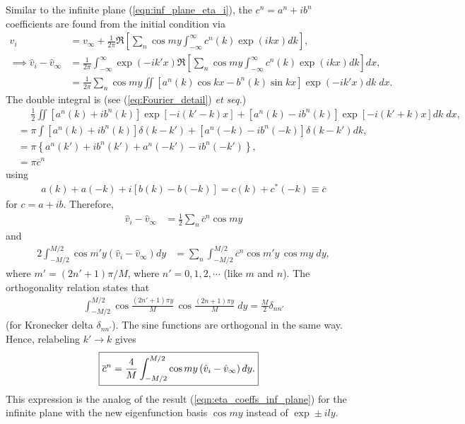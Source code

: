 \documentclass[10pt,reqno]{amsart}
\begin{document}
Similar to the infinite plane (\ref{eqn:inf_plane_eta_i}), the $c^n = a^n + i b^n$ coefficients are found from the initial condition via
\begin{align}
v_i & = v_\infty + \frac{1}{2 \pi} \Re \left[ \sum_n  \cos m y \int_{-\infty}^{\infty} c^n (k) \exp \left(i k x \right)  dk \right] ,  \label{eq:channel_c_v} \\
\implies \hat{v}_i - \hat{v}_\infty & = \frac{1}{2 \pi} \int_{-\infty}^{\infty} \exp \left( - i k' x \right) \Re \left[ \sum_n  \cos m y \int_{-\infty}^{\infty} c^n (k) \exp \left(i k x \right) dk  \right] dx ,   \\
& = \frac{1}{2 \pi} \sum_n \cos m y \iint \left[ a^n (k) \cos k x - b^n (k) \sin k x \right] \exp \left(-i k' x \right) dk \;  dx .   
\end{align}
The double integral is (see (\ref{eq:Fourier_detail}) \textit{et seq.})
\begin{align}
&\phantom{ =} \frac{1}{2} \iint \left[ a^n (k) + i b^n (k) \right] \exp \left[-i \left( k' - k \right) x \right] + \left[ a^n (k) - i b^n (k) \right] \exp \left[-i \left(k' + k \right) x \right] dk \;  dx ,   \\
& = \pi \int \left[ a^n (k) + i b^n (k) \right] \delta \left( k - k' \right)  + \left[ a^n (-k) - i b^n (-k) \right] \delta \left(k - k' \right)  dk  ,   \\
& = \pi \left\{ a^n (k') + i b^n (k') + a^n (-k') - i b^n (-k') \right\}  , \\
& = \pi \overline{c}^n
\end{align}
using
\begin{align}
a(k) + a(-k) + i \left[ b(k) - b(-k) \right] = c(k) + c^* (-k) \equiv \overline{c}
\label{eqn:overline_operator}
\end{align}
 for $c = a + i b$.
Therefore, 
\begin{align}
\hat{v}_i - \hat{v}_\infty & = \frac{1}{2} \sum_n \overline{c}^n \cos m y 
\label{eqn:channel_c_n_formula}
\end{align}
and
\begin{align}
2 \int_{-M/2}^{M/2}  \cos m' y \left( \hat{v}_i - \hat{v}_\infty \right) dy & = \sum_n \int_{-M/2}^{M/2} \overline{c}^n \cos m' y \, \cos m y \; dy,   
\end{align}
where $m' = (2n'+1) \pi / M$, where $n' = 0, 1, 2, \cdots$ (like $m$ and $n$).
The orthogonality relation states that
\begin{align}
\int_{-M/2}^{M/2} \cos \frac{(2n' + 1) \pi y }{M} \,\cos \frac{(2n + 1) \pi y }{M} \; dy = \frac{M}{2} \delta_{n n'}  
\label{eqn:trig_orthogonality}
\end{align}
(for Kronecker delta $\delta_{n n'}$).
The sine functions are orthogonal in the same way.
Hence, relabeling $k' \rightarrow k$ gives
\begin{align}
\Aboxed{
\overline{c}^n & = \frac{4}{M} \int_{-M/2}^{M/2}  \cos m y \left( \hat{v}_i - \hat{v}_\infty \right) dy.   
}
\label{eq:channel_v_soln}
\end{align}
This expression is the analog of the result (\ref{eqn:eta_coeffs_inf_plane}) for the infinite plane with the new eigenfunction basis $\cos m y$ instead of $\exp \pm i l y$.
\end{document}
